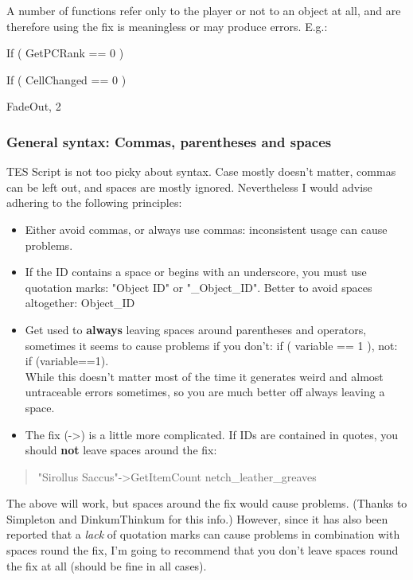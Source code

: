 \documentclass[
]{article}
\begin{document}
A number of functions refer only to the player or not to an object at
all, and are therefore using the fix is meaningless or may produce
errors. E.g.:

If ( GetPCRank == 0 )

If ( CellChanged == 0 )

FadeOut, 2

\hypertarget{general-syntax-commas-parentheses-and-spaces}{%
\subsubsection{General syntax: Commas, parentheses and
spaces}\label{general-syntax-commas-parentheses-and-spaces}}

TES Script is not too picky about syntax. Case mostly doesn't matter,
commas can be left out, and spaces are mostly ignored. Nevertheless I
would advise adhering to the following principles:

\begin{itemize}
\item
  Either avoid commas, or always use commas: inconsistent usage can
  cause problems.
\item
  If the ID contains a space or begins with an underscore, you must use
  quotation marks: "Object ID" or "\_Object\_ID". Better to avoid spaces
  altogether: Object\_ID
\item
  Get used to \textbf{always} leaving spaces around parentheses and
  operators, sometimes it seems to cause problems if you don't: if (
  variable == 1 ), not: if (variable==1).\\
  While this doesn't matter most of the time it generates weird and
  almost untraceable errors sometimes, so you are much better off always
  leaving a space.
\item
  The fix (-\textgreater) is a little more complicated. If IDs are
  contained in quotes, you should \textbf{not} leave spaces around the
  fix:
\end{itemize}

\begin{quote}
"Sirollus Saccus"-\textgreater GetItemCount netch\_leather\_greaves
\end{quote}

The above will work, but spaces around the fix would cause problems.
(Thanks to Simpleton and DinkumThinkum for this info.) However, since it
has also been reported that a \emph{lack} of quotation marks can cause
problems in combination with spaces round the fix, I'm going to
recommend that you don't leave spaces round the fix at all (should be
fine in all cases).
\end{document}
